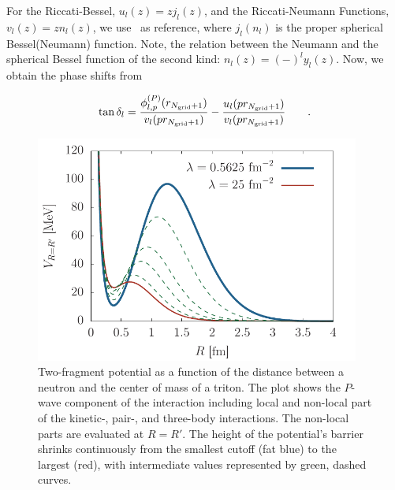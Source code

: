 \documentclass[aps,onecolumn,preprintnumbers,amsmath,amssymb,nofootinbib,superscriptaddress,notitlepage]{revtex4-1}
\begin{document}
For the Riccati-Bessel, $u_l(z)=zj_l(z)$, and the Riccati-Neumann Functions, $v_l(z)=zn_l(z)$, we use
\cite{}~as reference, where $j_l(n_l)$ is the proper spherical Bessel(Neumann) function. Note, the relation
between the Neumann and the spherical Bessel function of the second kind: $n_l(z)=(-)^ly_l(z)$.
Now, we obtain the phase shifts from

\begin{equation}\label{eq.app.phases}
\tan\delta_l=\frac{\phi_{l,p}^{(P)}(r_{N_\text{\tiny grid}+1})}{v_l(pr_{N_\text{\tiny grid}+1})}-
\frac{u_l(pr_{N_\text{\tiny grid}+1})}{v_l(pr_{N_\text{\tiny grid}+1})}
\qquad.
\end{equation}


\begin{figure}
\centering
\includegraphics[width=0.95\textwidth]{./Graphs/rgm_potential} 
\caption{Two-fragment potential as a function of the distance between a
neutron and the center of mass of a triton. The plot shows the $P$-wave component of the
interaction including local and non-local part of the kinetic-, pair-, and three-body interactions.
The non-local parts are evaluated at $R=R'$. The height of the potential's barrier shrinks continuously from
the smallest cutoff (fat blue) to the largest (red), with intermediate values represented by green, dashed curves.}
\label{fig:rgm_potential}
\end{figure}
\end{document}
